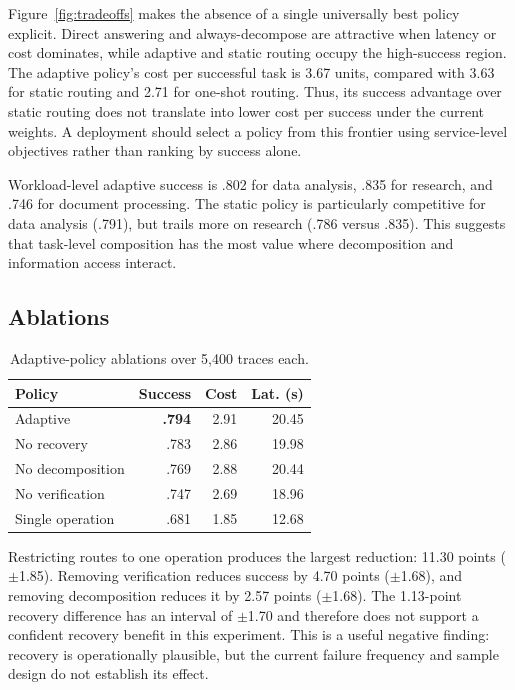 \documentclass[sigconf]{acmart}
\begin{document}
Figure~\ref{fig:tradeoffs} makes the absence of a single universally best policy explicit. Direct answering and always-decompose are attractive when latency or cost dominates, while adaptive and static routing occupy the high-success region. The adaptive policy's cost per successful task is 3.67 units, compared with 3.63 for static routing and 2.71 for one-shot routing. Thus, its success advantage over static routing does not translate into lower cost per success under the current weights. A deployment should select a policy from this frontier using service-level objectives rather than ranking by success alone.

Workload-level adaptive success is .802 for data analysis, .835 for research, and .746 for document processing. The static policy is particularly competitive for data analysis (.791), but trails more on research (.786 versus .835). This suggests that task-level composition has the most value where decomposition and information access interact.

\subsection{Ablations}

\begin{table}[t]
\caption{Adaptive-policy ablations over 5,400 traces each.}
\label{tab:ablation}
\small
\begin{tabular}{lrrr}
\toprule
Policy & Success & Cost & Lat. (s) \\
\midrule
Adaptive & \textbf{.794} & 2.91 & 20.45 \\
No recovery & .783 & 2.86 & 19.98 \\
No decomposition & .769 & 2.88 & 20.44 \\
No verification & .747 & 2.69 & 18.96 \\
Single operation & .681 & 1.85 & 12.68 \\
\bottomrule
\end{tabular}
\end{table}

Restricting routes to one operation produces the largest reduction: 11.30 points ($\pm$1.85). Removing verification reduces success by 4.70 points ($\pm$1.68), and removing decomposition reduces it by 2.57 points ($\pm$1.68). The 1.13-point recovery difference has an interval of $\pm$1.70 and therefore does not support a confident recovery benefit in this experiment. This is a useful negative finding: recovery is operationally plausible, but the current failure frequency and sample design do not establish its effect.
\end{document}
